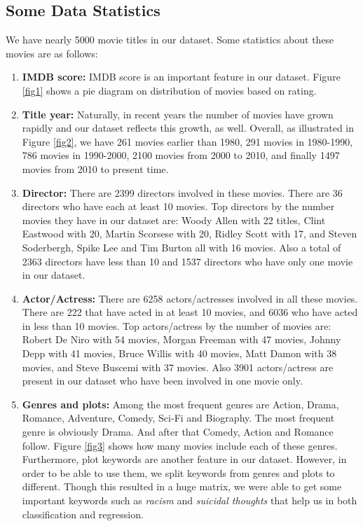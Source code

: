 \documentclass[journal,transmag]{IEEEtran}
\begin{document}
\subsection{Some Data Statistics}
We have nearly 5000 movie titles in our dataset. Some statistics about these movies are as follows:

\begin{enumerate}
\item{\textbf{IMDB score:}} IMDB score is an important feature in our dataset. Figure \ref{fig1} shows a pie diagram on distribution of movies based on rating.

\item{\textbf{Title year:}} Naturally, in recent years the number of movies have grown rapidly and our dataset reflects this growth, as well. Overall, as illustrated in Figure \ref{fig2}, we have 261 movies earlier than 1980, 291 movies in 1980-1990, 786 movies in 1990-2000, 2100 movies from 2000 to 2010, and finally 1497 movies from 2010 to present time.

\item{\textbf{Director:}} There are 2399 directors involved in these movies. There are 36 directors who have each at least 10 movies. Top directors by the number movies they have in our dataset are: Woody Allen with 22 titles, Clint Eastwood with 20, Martin Scorsese with 20, Ridley Scott with 17, and Steven Soderbergh, Spike Lee and Tim Burton all with 16 movies. Also a total of 2363 directors have less than 10 and 1537 directors who have only one movie in our dataset.

\item{\textbf{Actor/Actress:}} There are 6258 actors/actresses involved in all these movies. There are 222 that have acted in at least 10 movies, and 6036 who have acted in less than 10 movies. Top actors/actress by the number of movies are: Robert De Niro with 54 movies, Morgan Freeman with 47 movies, Johnny Depp with 41 movies, Bruce Willis with 40 movies, Matt Damon with 38 movies, and Steve Buscemi with 37 movies. Also 3901 actors/actress are present in our dataset who have been involved in one movie only.

\item{\textbf{Genres and plots:}} Among the most frequent genres are Action, Drama, Romance, Adventure, Comedy, Sci-Fi and Biography. The most frequent genre is obviously Drama. And after that Comedy, Action and Romance follow. Figure \ref{fig3} shows how many movies include each of these genres. Furthermore, plot keywords are another feature in our dataset. However, in order to be able to use them, we split keywords from genres and plots to different. Though this resulted in a huge matrix, we were able to get some important keywords such as \emph{racism} and \emph{suicidal thoughts} that help us in both classification and regression.


\end{enumerate}
\end{document}
